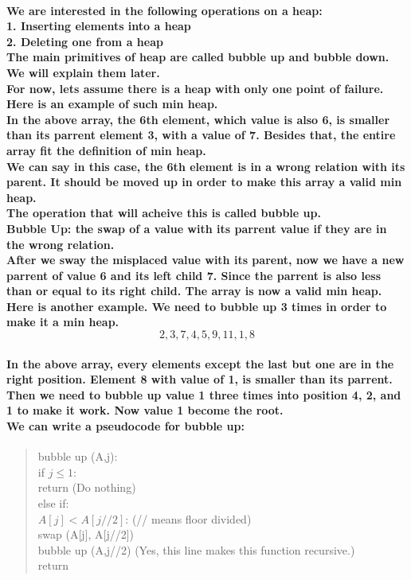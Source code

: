 \documentclass{article}
\begin{document}
\paragraph{We are interested in the following operations on a heap:\\
1. Inserting elements into a heap\\
2. Deleting one from a heap\\
The main primitives of heap are called bubble up and bubble down. We will explain them later.\\
For now, lets assume there is a heap with only one point of failure. Here is an example of such min heap.\\
In the above array, the 6th element, which value is also 6, is smaller than its parrent element 3, with a value of 7. Besides that, the entire array fit the definition of min heap.\\
We can say in this case, the 6th element is in a wrong relation with its parent. It should be moved up in order to make this array a valid min heap.\\
The operation that will acheive this is called bubble up.\\
Bubble Up: the swap of a value with its parrent value if they are in the wrong relation.\\
After we sway the misplaced value with its parent, now we have a new parrent of value 6 and its left child 7. Since the parrent is also less than or equal to its right child. The array is now a valid min heap.\\
Here is another example. We need to bubble up 3 times in order to make it a min heap.\\
\[2,3,7,4,5,9,11,1,8\]\\
In the above array, every elements except the last but one are in the right position. Element 8 with value of 1, is smaller than its parrent.\\
Then we need to bubble up value 1 three times into position 4, 2, and 1 to make it work. Now value 1 become the root.\\
We can write a pseudocode for bubble up:\\}

\begin{quote}
    bubble up (A,j):\\
    if $j \leq 1$:\\
        return (Do nothing)\\
    else if:\\
        $A[j] < A[j//2]$: (// means floor divided)\\
        swap (A[j], A[j//2])\\
        bubble up (A,j//2) (Yes, this line makes this function recursive.)\\
    return\\
    \end{quote}
\end{document}
